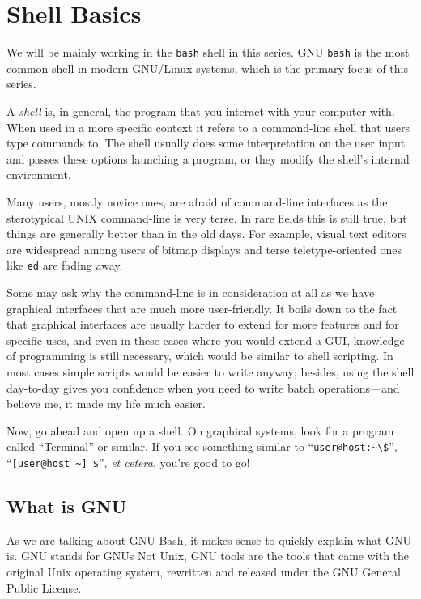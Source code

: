 \documentclass{extbook}
\begin{document}
\chapter{Shell Basics}

We will be mainly working in the \texttt{bash} shell in this series.  GNU \texttt{bash} is the most common shell in modern GNU/Linux systems, which is the primary focus of this series.

A \textit{shell} is, in general, the program that you interact with your computer with.  When used in a more specific context it refers to a command-line shell that users type commands to.  The shell usually does some interpretation on the user input and passes these options launching a program, or they modify the shell's internal environment.

Many users, mostly novice ones, are afraid of command-line interfaces as the sterotypical UNIX command-line is very terse.  In rare fields this is still true, but things are generally better than in the old days.  For example, visual text editors are widespread among users of bitmap displays and terse teletype-oriented ones like \texttt{ed} are fading away.

Some may ask why the command-line is in consideration at all as we have graphical interfaces that are much more user-friendly.  It boils down to the fact that graphical interfaces are usually harder to extend for more features and for specific uses, and even in these cases where you would extend a GUI, knowledge of programming is still necessary, which would be similar to shell scripting.  In most cases simple scripts would be easier to write anyway; besides, using the shell day-to-day gives you confidence when you need to write batch operations---and believe me, it made my life much easier.

Now, go ahead and open up a shell.  On graphical systems, look for a program called ``Terminal'' or similar.  If you see something similar to ``\verb|user@host:~\$|'', ``\verb|[user@host ~] $|'', \textit{et cetera}, you're good to go!

\section{What is GNU}

As we are talking about GNU Bash, it makes sense to quickly explain what GNU is.   GNU stands for GNUs Not Unix,  GNU tools are the tools that came with the original Unix operating system, rewritten and released under the GNU General Public License. 
\end{document}
